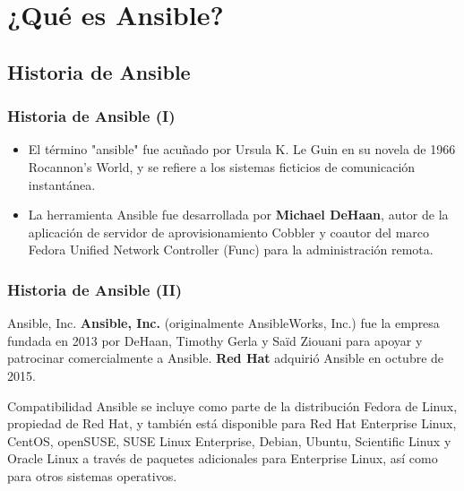 \documentclass[
	11pt, %
]{beamer}
\begin{document}

\section{¿Qué es Ansible?}

\subsection{Historia de Ansible}

\begin{frame}
	\frametitle{Historia de Ansible (I)}

	\begin{itemize}
		\item El término "ansible" fue acuñado por Ursula K. Le Guin en su novela de 1966 Rocannon's World, y se refiere a los sistemas ficticios de comunicación instantánea.

		\item La herramienta Ansible fue desarrollada por \textbf{Michael DeHaan}, autor de la aplicación de servidor de aprovisionamiento Cobbler y coautor del marco Fedora Unified Network Controller (Func) para la administración remota. \cite{p2}

	\end{itemize}

\end{frame}


\begin{frame}
	\frametitle{Historia de Ansible (II)}

	\begin{block}{Ansible, Inc.}
		\textbf{Ansible, Inc.} (originalmente AnsibleWorks, Inc.) fue la empresa fundada en 2013 por DeHaan, Timothy Gerla y Saïd Ziouani para apoyar y patrocinar comercialmente a Ansible.  \textbf{Red Hat} adquirió Ansible en octubre de 2015.

	\end{block}
	\begin{block}{Compatibilidad}
		Ansible se incluye como parte de la distribución Fedora de Linux, propiedad de Red Hat, y también está disponible para Red Hat Enterprise Linux, CentOS, openSUSE, SUSE Linux Enterprise, Debian, Ubuntu, Scientific Linux y Oracle Linux a través de paquetes adicionales para Enterprise Linux, así como para otros sistemas operativos. \cite{p2}
	\end{block}

\end{frame}
\end{document}
